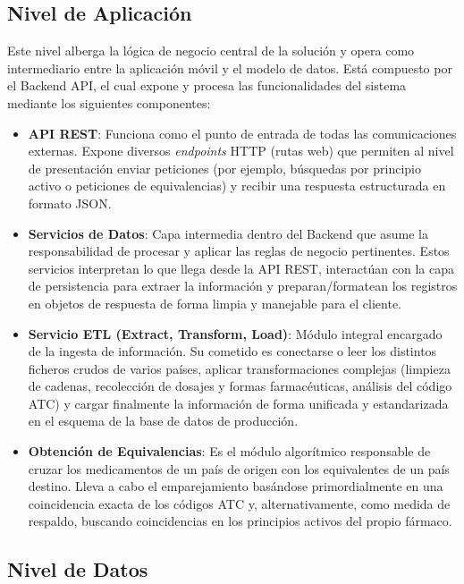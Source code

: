 \documentclass[11pt,a4paper]{article}
\begin{document}
\subsection{Nivel de Aplicación}

Este nivel alberga la lógica de negocio central de la solución y opera como intermediario entre la aplicación móvil y el modelo de datos. Está compuesto por el Backend API, el cual expone y procesa las funcionalidades del sistema mediante los siguientes componentes:

\begin{itemize}
    \item \textbf{API REST}: Funciona como el punto de entrada de todas las comunicaciones externas. Expone diversos \textit{endpoints} HTTP (rutas web) que permiten al nivel de presentación enviar peticiones (por ejemplo, búsquedas por principio activo o peticiones de equivalencias) y recibir una respuesta estructurada en formato JSON.
    \item \textbf{Servicios de Datos}: Capa intermedia dentro del Backend que asume la responsabilidad de procesar y aplicar las reglas de negocio pertinentes. Estos servicios interpretan lo que llega desde la API REST, interactúan con la capa de persistencia para extraer la información y preparan/formatean los registros en objetos de respuesta de forma limpia y manejable para el cliente.
    \item \textbf{Servicio ETL (Extract, Transform, Load)}: Módulo integral encargado de la ingesta de información. Su cometido es conectarse o leer los distintos ficheros crudos de varios países, aplicar transformaciones complejas (limpieza de cadenas, recolección de dosajes y formas farmacéuticas, análisis del código ATC) y cargar finalmente la información de forma unificada y estandarizada en el esquema de la base de datos de producción.
    \item \textbf{Obtención de Equivalencias}: Es el módulo algorítmico responsable de cruzar los medicamentos de un país de origen con los equivalentes de un país destino. Lleva a cabo el emparejamiento basándose primordialmente en una coincidencia exacta de los códigos ATC y, alternativamente, como medida de respaldo, buscando coincidencias en los principios activos del propio fármaco.
\end{itemize}

\subsection{Nivel de Datos}
\end{document}
